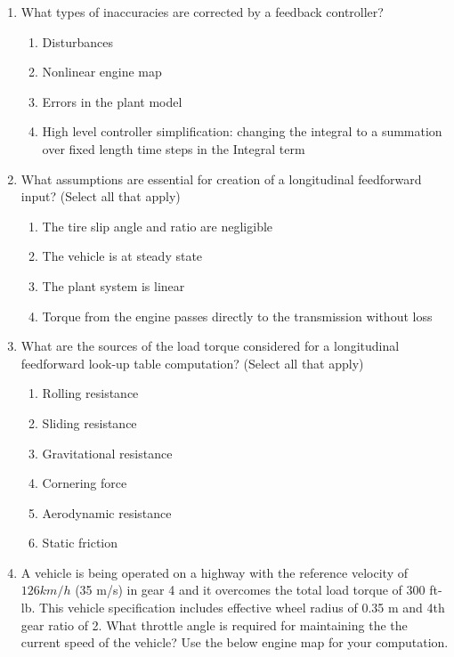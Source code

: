 \begin{enumerate}
\begin{enumerate}
	\end{enumerate}
\item What types of inaccuracies are corrected by a feedback controller?
	\begin{enumerate}
		\item  Disturbances
		\item Nonlinear engine map
		\item Errors in the plant model
		\item High level controller simplification: changing the integral to a summation over fixed length time steps in the Integral term
	\end{enumerate}
\item What assumptions are essential for creation of a longitudinal feedforward input? (Select all that apply)
	\begin{enumerate}
		\item  The tire slip angle and ratio are negligible
		\item The vehicle is at steady state
		\item The plant system is linear
		\item Torque from the engine passes directly to the transmission without loss
	\end{enumerate}
\item What are the sources of the load torque considered for a longitudinal feedforward look-up table computation? (Select all that apply) 
	\begin{enumerate}
		\item   Rolling resistance
		\item Sliding resistance
		\item Gravitational resistance
		\item Cornering force
		\item Aerodynamic resistance
		\item Static friction
	\end{enumerate}
\item A vehicle is being operated on a highway with the reference velocity of $126km/h$ (35 m/s) 
in gear 4 and it overcomes the total load torque of 300 ft-lb. 
This vehicle specification includes effective wheel radius of 0.35 m and 4th gear ratio of 2. 
What throttle angle is required for maintaining the the current speed of the vehicle? Use the below engine map for your computation. 


\end{enumerate}
